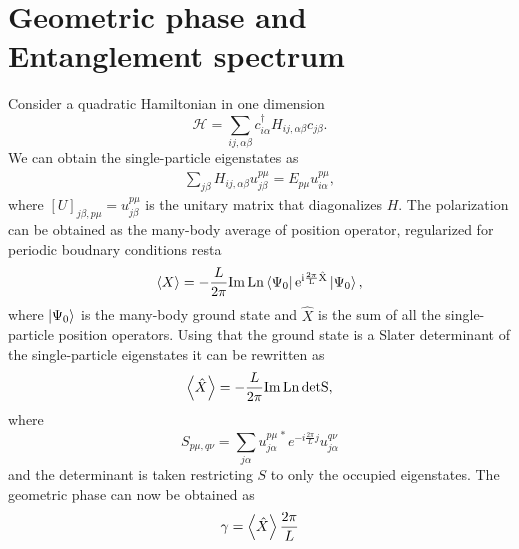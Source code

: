 \documentclass[twocolumn,amsmath,longbibliography,amssymb,superscriptaddress]{revtex4-1}
\newcommand{\carlos}[1]{{\color{red} #1}}
\begin{document}
\section{Geometric phase and Entanglement spectrum}
Consider a quadratic Hamiltonian in one dimension
\begin{equation}
\mathcal{H} = \sum_{ij,\alpha\beta} c_{i\alpha}^\dagger H_{ij,\alpha \beta}c_{j\beta}.
\end{equation}
We can obtain the single-particle eigenstates as
\begin{align*}
\sum_{j\beta}H_{ij,\alpha\beta} u^{p\mu}_{j\beta} = E_{p\mu} u_{i\alpha}^{p\mu},
\end{align*}
where $[U]_{j\beta,p\mu} = u^{p\mu}_{j\beta}$ is the unitary matrix that diagonalizes $H$. The polarization can be obtained as the many-body average of position operator, regularized for periodic boudnary conditions \carlos{resta}
\begin{align*}
\expval{X} = -\frac{L}{2\pi} \rm{ Im\, Ln }\bra{\Psi_0}e^{i \frac{2\pi}{L}\hat{X}}\ket{\Psi_0},
\end{align*}
where $\ket{\Psi_0}$ is the many-body ground state and $\hat{X}$ is the sum of all the single-particle position operators.
Using that the ground state is a Slater determinant of the single-particle eigenstates it can be rewritten as
\begin{align*}
\expval{\hat{X}} = -\frac{L}{2\pi} \rm{Im \, Ln}\, {\rm det} S,
\end{align*}
where 
\begin{equation}
S_{p\mu,q\nu} = \sum_{j\alpha}u^{p\mu\, \ast}_{j \alpha} e^{-i\frac{2\pi}{L}j}u^{q\nu}_{j \alpha}
\end{equation}
and the determinant is taken restricting $S$ to only the occupied eigenstates. The geometric phase can now be obtained as
\begin{equation}
\gamma = \expval{\hat{X}}\frac{2\pi}{L}
\end{equation}
\end{document}
